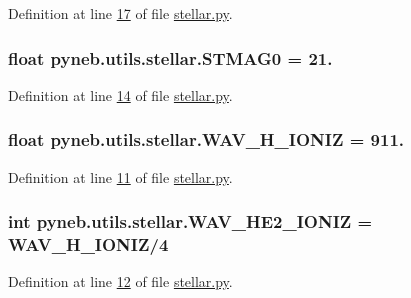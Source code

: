 Definition at line \hyperlink{stellar_8py_source_l00017}{17} of file \hyperlink{stellar_8py_source}{stellar.\-py}.

\hypertarget{namespacepyneb_1_1utils_1_1stellar_a53dc996c80c0bc5ee416b1fcbb8a6afc}{
\subsubsection[{S\-T\-M\-A\-G0}]{\setlength{\rightskip}{0pt plus 5cm}float pyneb.\-utils.\-stellar.\-S\-T\-M\-A\-G0 = 21.}}\label{namespacepyneb_1_1utils_1_1stellar_a53dc996c80c0bc5ee416b1fcbb8a6afc}


Definition at line \hyperlink{stellar_8py_source_l00014}{14} of file \hyperlink{stellar_8py_source}{stellar.\-py}.

\hypertarget{namespacepyneb_1_1utils_1_1stellar_afb8d2a4b14477b7097da285535eafc12}{
\subsubsection[{W\-A\-V\-\_\-\-H\-\_\-\-I\-O\-N\-I\-Z}]{\setlength{\rightskip}{0pt plus 5cm}float pyneb.\-utils.\-stellar.\-W\-A\-V\-\_\-\-H\-\_\-\-I\-O\-N\-I\-Z = 911.}}\label{namespacepyneb_1_1utils_1_1stellar_afb8d2a4b14477b7097da285535eafc12}


Definition at line \hyperlink{stellar_8py_source_l00011}{11} of file \hyperlink{stellar_8py_source}{stellar.\-py}.

\hypertarget{namespacepyneb_1_1utils_1_1stellar_a1b0844f39c08a2b7289ad093042cf55e}{
\subsubsection[{W\-A\-V\-\_\-\-H\-E2\-\_\-\-I\-O\-N\-I\-Z}]{\setlength{\rightskip}{0pt plus 5cm}int pyneb.\-utils.\-stellar.\-W\-A\-V\-\_\-\-H\-E2\-\_\-\-I\-O\-N\-I\-Z = {\bf W\-A\-V\-\_\-\-H\-\_\-\-I\-O\-N\-I\-Z}/4}}\label{namespacepyneb_1_1utils_1_1stellar_a1b0844f39c08a2b7289ad093042cf55e}


Definition at line \hyperlink{stellar_8py_source_l00012}{12} of file \hyperlink{stellar_8py_source}{stellar.\-py}.

